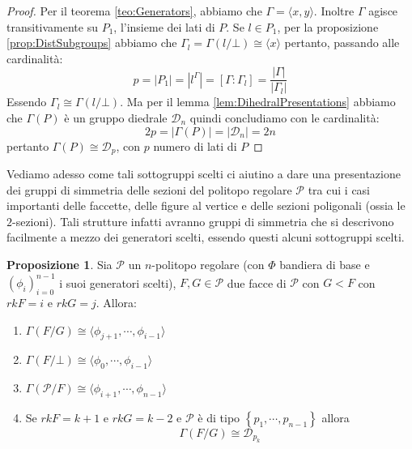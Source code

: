 \documentclass[a4paper,12pt]{report}
\newcommand{\p}{\mathcal{P}}
\theoremstyle{plain}
\theoremstyle{definition}
\newtheorem{prop}[teo]{Proposizione}
\newcommand\locallabel[1]{\label{\currentprefix_#1}}
\begin{document}
\begin{proof}
Per il teorema \ref{teo:Generators}, abbiamo che $\Gamma=\langle x,y\rangle$. Inoltre $\Gamma$ agisce transitivamente su $P_1$, l'insieme dei
lati di $P$. Se $l\in P_1$, per la proposizione \ref{prop:DistSubgroups} abbiamo che $\Gamma_l=\Gamma(l/\bot)\cong\langle x\rangle$
pertanto, passando alle cardinalit\`a:
\begin{equation*}
p=\left|P_1\right|=\left|l^\Gamma\right|=\left[\Gamma:\Gamma_l\right]=\frac{\left|\Gamma\right|}{\left|\Gamma_l\right|}
\end{equation*}
Essendo $\Gamma_l\cong\Gamma(l/\bot)$. Ma per il lemma \ref{lem:DihedralPresentations} abbiamo che $\Gamma(P)$ \`e un gruppo diedrale $\mathcal{D}_n$
quindi concludiamo con le cardinalit\`a:
\begin{equation*}
2p=\left|\Gamma(P)\right|=\left|\mathcal{D}_n\right|=2n
\end{equation*}
pertanto $\Gamma(P)\cong\mathcal{D}_p$, con $p$ numero di lati di $P$
\end{proof}
Vediamo adesso come tali sottogruppi scelti ci aiutino a dare una presentazione dei gruppi di simmetria delle sezioni del politopo regolare $\p$ tra
cui i casi importanti delle faccette, delle figure al vertice e delle sezioni poligonali (ossia le $2$-sezioni). Tali strutture infatti avranno gruppi
di simmetria che si descrivono facilmente a mezzo dei generatori scelti, essendo questi alcuni sottogruppi scelti.
\def\currentprefix{prop:SelectedSubgroupsSections}
\begin{prop}
\label{prop:SelectedSubgroupsSections}
Sia $\p$ un $n$-politopo regolare (con $\Phi$ bandiera di base e $(\phi_i)_{i=0}^{n-1}$ i suoi generatori scelti),
$F,G\in\p$ due facce di $\p$ con $G<F$ con $rkF=i$ e $rkG=j$. Allora:
\begin{enumerate}
\item\locallabel{1}$\Gamma(F/G)\cong\langle \phi_{j+1},\cdots,\phi_{i-1}\rangle$
\item\locallabel{2}$\Gamma(F/\bot)\cong\langle \phi_0,\cdots,\phi_{i-1}\rangle$
\item\locallabel{3}$\Gamma(\p/F)\cong\langle\phi_{i+1},\cdots,\phi_{n-1}\rangle$
\item\locallabel{4}Se $rkF=k+1$ e $rkG=k-2$ e $\p$ \`e di tipo $\left\{p_1,\cdots,p_{n-1}\right\}$ allora
\begin{equation}
\Gamma(F/G)\cong\mathcal{D}_{p_k}
\end{equation}
\end{enumerate}
\end{prop}
\end{document}
